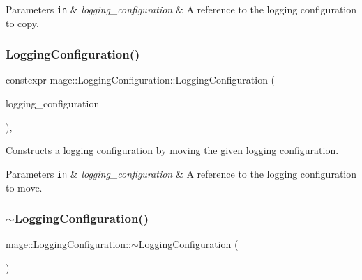 \begin{DoxyParams}[1]{Parameters}
\mbox{\tt in}  & {\em logging\+\_\+configuration} & A reference to the logging configuration to copy. \\
\hline
\end{DoxyParams}
\hypertarget{classmage_1_1_logging_configuration_a447ba40938b958f3677e8f096970ae8e}{}\label{classmage_1_1_logging_configuration_a447ba40938b958f3677e8f096970ae8e} 
\subsubsection{\texorpdfstring{Logging\+Configuration()}{LoggingConfiguration()}\hspace{0.1cm}{\footnotesize\ttfamily [3/3]}}
{\footnotesize\ttfamily constexpr mage\+::\+Logging\+Configuration\+::\+Logging\+Configuration (\begin{DoxyParamCaption}\item[{\hyperlink{classmage_1_1_logging_configuration}{Logging\+Configuration} \&\&}]{logging\+\_\+configuration }\end{DoxyParamCaption})\hspace{0.3cm}{\ttfamily [default]}, {\ttfamily [noexcept]}}

Constructs a logging configuration by moving the given logging configuration.


\begin{DoxyParams}[1]{Parameters}
\mbox{\tt in}  & {\em logging\+\_\+configuration} & A reference to the logging configuration to move. \\
\hline
\end{DoxyParams}
\hypertarget{classmage_1_1_logging_configuration_a842cd1d5cf22c9fb6e2c76e684cd08ee}{}\label{classmage_1_1_logging_configuration_a842cd1d5cf22c9fb6e2c76e684cd08ee} 
\subsubsection{\texorpdfstring{$\sim$\+Logging\+Configuration()}{~LoggingConfiguration()}}
{\footnotesize\ttfamily mage\+::\+Logging\+Configuration\+::$\sim$\+Logging\+Configuration (\begin{DoxyParamCaption}{ }\end{DoxyParamCaption})\hspace{0.3cm}{\ttfamily [default]}}

